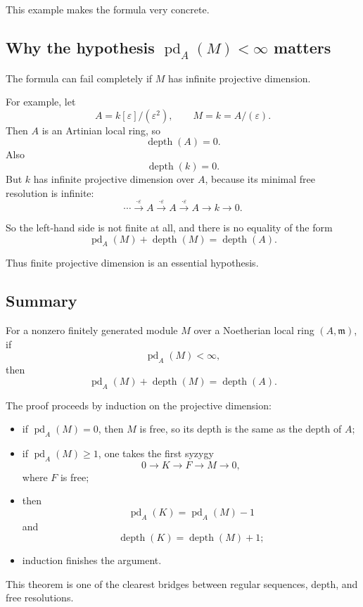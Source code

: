 \documentclass[12pt,a4paper]{article}
\theoremstyle{notespace}
\begin{document}
This example makes the formula very concrete.

\subsection{Why the hypothesis \(\operatorname{pd}_A(M)<\infty\) matters}

The formula can fail completely if \(M\) has infinite projective dimension.

For example, let
\[
A=k[\varepsilon]/(\varepsilon^2),
\qquad
M=k=A/(\varepsilon).
\]
Then \(A\) is an Artinian local ring, so
\[
\operatorname{depth}(A)=0.
\]
Also
\[
\operatorname{depth}(k)=0.
\]
But \(k\) has infinite projective dimension over \(A\), because its minimal free resolution is infinite:
\[
\cdots \xrightarrow{\cdot \varepsilon} A \xrightarrow{\cdot \varepsilon} A \xrightarrow{\cdot \varepsilon} A \longrightarrow k \longrightarrow 0.
\]

So the left-hand side is not finite at all, and there is no equality of the form
\[
\operatorname{pd}_A(M)+\operatorname{depth}(M)=\operatorname{depth}(A).
\]

Thus finite projective dimension is an essential hypothesis.

\subsection{Summary}

For a nonzero finitely generated module \(M\) over a Noetherian local ring \((A,\mathfrak m)\), if
\[
\operatorname{pd}_A(M)<\infty,
\]
then
\[
\operatorname{pd}_A(M)+\operatorname{depth}(M)=\operatorname{depth}(A).
\]

The proof proceeds by induction on the projective dimension:
\begin{itemize}
	\item if \(\operatorname{pd}_A(M)=0\), then \(M\) is free, so its depth is the same as the depth of \(A\);
	\item if \(\operatorname{pd}_A(M)\ge 1\), one takes the first syzygy
	\[
	0 \longrightarrow K \longrightarrow F \longrightarrow M \longrightarrow 0,
	\]
	where \(F\) is free;
	\item then
	\[
	\operatorname{pd}_A(K)=\operatorname{pd}_A(M)-1
	\]
	and
	\[
	\operatorname{depth}(K)=\operatorname{depth}(M)+1;
	\]
	\item induction finishes the argument.
\end{itemize}

This theorem is one of the clearest bridges between regular sequences, depth, and free resolutions.
\end{document}
